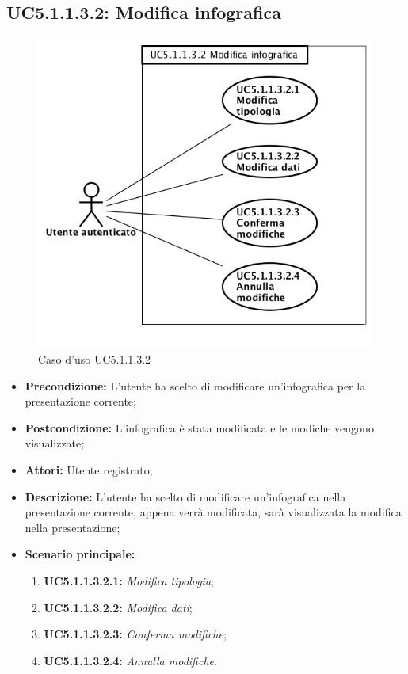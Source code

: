 \subsection{ UC5.1.1.3.2: Modifica infografica}

\begin{figure}[h]
	\begin{center}
	\includegraphics[scale=0.6]{diagram/UC5-1-1-3-2.png}
	\caption{Caso d'uso UC5.1.1.3.2}
	\end{center}
\end{figure}
\begin{itemize}
	\item \textbf{Precondizione:} L'utente ha scelto di modificare un'infografica per la presentazione corrente;
	\item \textbf{Postcondizione:} L'infografica è stata modificata e le modiche vengono visualizzate;
	\item \textbf{Attori:} Utente registrato;
	\item \textbf{Descrizione:} L'utente ha scelto di modificare un'infografica nella presentazione corrente, appena verrà modificata, sarà visualizzata la modifica nella presentazione;
	\item \textbf{Scenario principale:}
	\begin{enumerate}
		\item \textbf{ UC5.1.1.3.2.1:} \textit{ Modifica tipologia};
		\item \textbf{ UC5.1.1.3.2.2:} \textit{ Modifica dati};
		\item \textbf{ UC5.1.1.3.2.3:} \textit{ Conferma modifiche};
		\item \textbf{ UC5.1.1.3.2.4:} \textit{ Annulla modifiche}.
	\end{enumerate}
\end{itemize}

